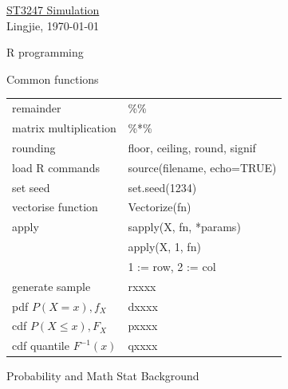\documentclass[a4paper,12pt,landscape]{article}
\begin{document}
\raggedright
\footnotesize
\begin{multicols}{3}


\setlength{\columnseprule}{0.25pt}
\setlength{\premulticols}{1pt}
\setlength{\postmulticols}{1pt}
\setlength{\multicolsep}{1pt}
\setlength{\columnsep}{2pt}

\begin{center}
     \Large{\underline{ST3247 Simulation}} \\
     {Lingjie, \today}
\end{center}

\begin{section}{R programming}

	\begin{subsection}{Common functions}
		\begin{tabulary}{\linewidth}{l @{ : }  L}
			remainder & \%\% \\
			matrix multiplication & \%*\% \\
			rounding & floor, ceiling, round, signif \\
			load R commands & source(filename, echo=TRUE) \\
			set seed & set.seed(1234) \\
			vectorise function & Vectorize(fn) \\
			apply & sapply(X, fn, *params) \\
			& apply(X, 1, fn) \\ &1 := row, 2 := col \\
			generate sample & rxxxx \\
			pdf $P(X=x), f_X$ & dxxxx \\
			cdf $P(X\leq x), F_X$ & pxxxx \\
			cdf quantile $F^{-1}(x)$ & qxxxx \\
		\end{tabulary}
	\end{subsection}
\end{section}

\begin{section}{\small{Probability and Math Stat Background}}


\end{section}
\end{multicols}
\end{document}
